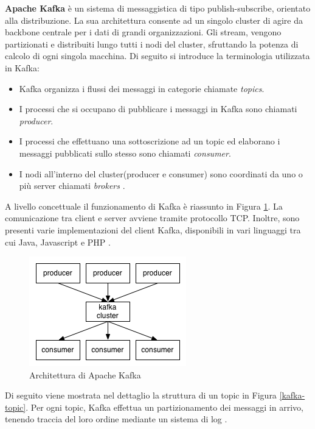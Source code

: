 \documentclass[12pt]{article}
\begin{document}
\textbf{Apache Kafka} è un sistema di messaggistica di tipo publish-subscribe, orientato alla distribuzione. La sua architettura consente ad un singolo cluster di agire da backbone centrale per i dati di grandi organizzazioni. Gli stream, vengono partizionati e distribuiti lungo tutti i nodi del cluster, sfruttando la potenza di calcolo di ogni singola macchina. Di seguito si introduce la terminologia utilizzata in Kafka: 

\begin{itemize}
	\item Kafka organizza i flussi dei messaggi in categorie chiamate \textit{topics}.
	\item I processi che si occupano di pubblicare i messaggi in Kafka sono chiamati \textit{producer}.
	\item I processi che effettuano una sottoscrizione ad un topic ed elaborano i messaggi pubblicati sullo stesso sono chiamati \textit{consumer}.
	\item I nodi all'interno del cluster(producer e consumer) sono coordinati da uno o più server chiamati \textit{brokers} \cite{kafka}.
\end{itemize}

A livello concettuale il funzionamento di Kafka è riassunto in Figura \ref{kafka}. La comunicazione tra client e server avviene tramite protocollo TCP. Inoltre, sono presenti varie implementazioni del client Kafka, disponibili in vari linguaggi tra cui Java, Javascript e PHP \cite{kafka}. 

\begin{figure}[H]
	\centering
	\includegraphics[scale=0.80]{images/kafka.png}
	\caption{Architettura di Apache Kafka \cite{kafka}}
	\label{kafka}
\end{figure}


Di seguito viene mostrata nel dettaglio la struttura di un topic in Figura \ref{kafka-topic}. Per ogni topic, Kafka effettua un partizionamento dei messaggi in arrivo, tenendo traccia del loro ordine mediante un sistema di log \cite{kafka}. 
\end{document}
